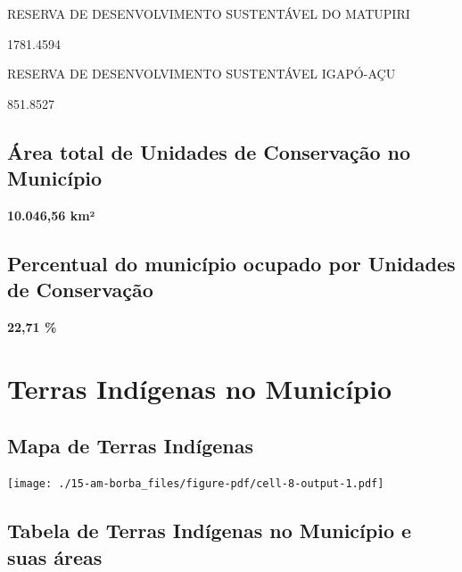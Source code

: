 \documentclass[
  letterpaper,
]{report}
\begin{document}
\n    

\n      

RESERVA DE DESENVOLVIMENTO SUSTENTÁVEL DO MATUPIRI

\n      

1781.4594

\n    

\n    

\n      

RESERVA DE DESENVOLVIMENTO SUSTENTÁVEL IGAPÓ-AÇU

\n      

851.8527

\n    

\n  

\n

\hypertarget{uxe1rea-total-de-unidades-de-conservauxe7uxe3o-no-municuxedpio-1}{%
\subsection{Área total de Unidades de Conservação no
Município}\label{uxe1rea-total-de-unidades-de-conservauxe7uxe3o-no-municuxedpio-1}}

\textbf{10.046,56 km²}

\hypertarget{percentual-do-municuxedpio-ocupado-por-unidades-de-conservauxe7uxe3o-1}{%
\subsection{Percentual do município ocupado por Unidades de
Conservação}\label{percentual-do-municuxedpio-ocupado-por-unidades-de-conservauxe7uxe3o-1}}

\textbf{22,71 \%}

\hypertarget{terras-induxedgenas-no-municuxedpio-1}{%
\section{Terras Indígenas no
Município}\label{terras-induxedgenas-no-municuxedpio-1}}

\hypertarget{mapa-de-terras-induxedgenas-1}{%
\subsection{Mapa de Terras
Indígenas}\label{mapa-de-terras-induxedgenas-1}}

\texttt{[image: ./15-am-borba\_files/figure-pdf/cell-8-output-1.pdf]}

\hypertarget{tabela-de-terras-induxedgenas-no-municuxedpio-e-suas-uxe1reas-1}{%
\subsection{Tabela de Terras Indígenas no Município e suas
áreas}\label{tabela-de-terras-induxedgenas-no-municuxedpio-e-suas-uxe1reas-1}}
\end{document}
